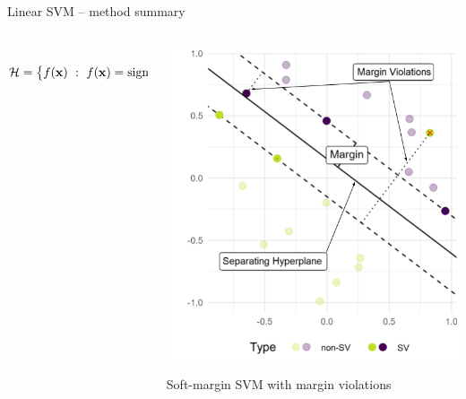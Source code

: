 \begin{vbframe}{Linear SVM -- method summary}
\begin{columns}[T]
\begin{column}{0.7\linewidth}
\medskip

 ~~ 
$\mathcal{H} = \left\{f(\mathbf{x}) ~:~f(\mathbf{x}) = \operatorname{sign} (\bm{\theta}^\top \mathbf{x} + \theta_0)\right\}$\\

\end{column}
\begin{column}{0.3\linewidth}
    
  \includegraphics[width=\linewidth]{figure/svm_wording.png} \\
  \begin{center}
  \tiny{Soft-margin SVM with margin violations}
  \end{center}
\end{column}
\end{columns}






\framebreak


\end{vbframe}
